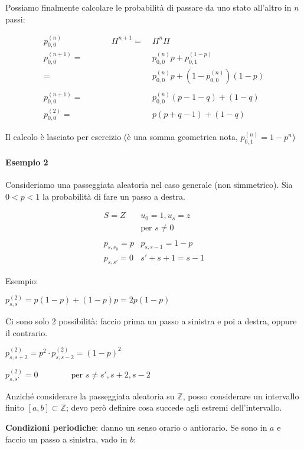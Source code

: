 \documentclass[a4paper,12pt]{book}
\begin{document}
Possiamo finalmente calcolare le probabilità di passare da uno stato all'altro in $ n $ passi:

\begin{align*}
	p_{0,0}^{(n)} \qquad \qquad \qquad \Pi^{n+1} = \; & \Pi^n \Pi \\
	p_{0,0}^{(n+1)} = \; & p_{0,0}^{(n)}p + p_{0,1}^{(1-p)} \\
	= \; & p_{0,0}^{(n)}p + (1-p_{0,0}^{(n)})(1-p)  \\ \\
	p_{0,0}^{(n+1)} = \; & p_{0,0}^{(n)}(p-1-q) + (1-q)  \\
	p_{0,0}^{(2)} = \; & p(p+q-1) + (1-q) 
\end{align*}

Il calcolo è lasciato per esercizio (è una somma geometrica nota, $ p_{0,1}^{(n)} = 1-p^{n} $)

\paragraph{Esempio 2} Consideriamo una passeggiata aleatoria nel caso generale (non simmetrico). Sia $ 0 < p < 1 $ la probabilità di fare un passo a destra. 

$$ 
	\begin{array}{cc}
	S = Z & u_0 = 1, u_s = z \\
	 & \text{per } s \ne 0 \\
	 & \\
	p_{s,s_0} = p & p_{s,s-1} = 1-p \\
	p_{s,s'} = 0 & s' + s+1 = s-1
	\end{array}
$$

Esempio: 

$ p_{s,s}^{(2)} = p(1-p) + (1-p)p = 2p(1-p) $

Ci sono solo 2 possibilità: faccio prima un passo a sinistra e poi a destra, oppure il contrario. 

$ p_{s, s+2}^{(2)} = p^2 \cdot p_{s,s-2}^{(2)}  = (1-p)^2$ 

$ p_{s,s'}^{(2)} = 0 \qquad \qquad \text{per } s \ne s', s+2, s-2$

Anziché considerare la passeggiata aleatoria su $\mathbb{Z}$, posso considerare un intervallo finito $ [a,b] \subset \mathbb{Z} $; devo però definire cosa succede agli estremi dell'intervallo. 

\textbf{Condizioni periodiche}: danno un senso orario o antiorario. Se sono in $ a $ e faccio un passo a sinistra, vado in $ b $:
\end{document}
